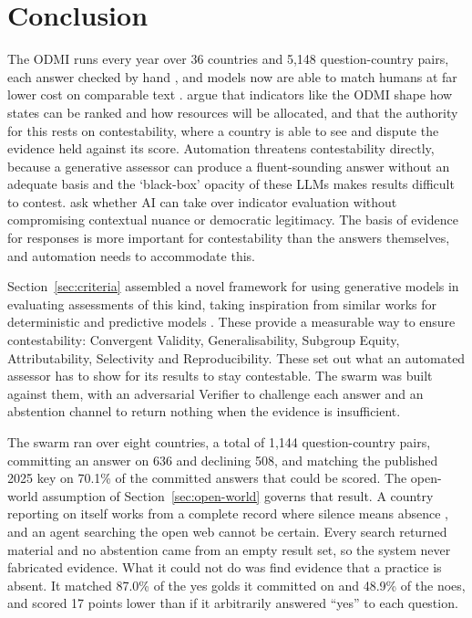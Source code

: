 \chapter{Conclusion}\label{ch:conclusion}

The ODMI runs every year over 36 countries and 5,148 question-country pairs, each answer checked by hand \citep{edp2025}, and models now are able to match humans at far lower cost on comparable text \citep{heseltine2024,tornberg2025}. \citet{davis2012} argue that indicators like the ODMI shape how states can be ranked and how resources will be allocated, and that the authority for this rests on contestability, where a country is able to see and dispute the evidence held against its score. Automation threatens contestability directly, because a generative assessor can produce a fluent-sounding answer without an adequate basis and the `black-box' opacity of these LLMs makes results difficult to contest. \citet{fumega2026} ask whether AI can take over indicator evaluation without compromising contextual nuance or democratic legitimacy. The basis of evidence for responses is more important for contestability than the answers themselves, and automation needs to accommodate this.

Section~\ref{sec:criteria} assembled a novel framework for using generative models in evaluating assessments of this kind, taking inspiration from similar works for deterministic and predictive models \citep{yung2022,williamson2012,schenk2024}. These provide a measurable way to ensure contestability: Convergent Validity, Generalisability, Subgroup Equity, Attributability, Selectivity and Reproducibility. These set out what an automated assessor has to show for its results to stay contestable. The swarm was built against them, with an adversarial Verifier to challenge each answer and an abstention channel to return nothing when the evidence is insufficient.

The swarm ran over eight countries, a total of 1,144 question-country pairs, committing an answer on 636 and declining 508, and matching the published 2025 key on 70.1\% of the committed answers that could be scored. The open-world assumption of Section~\ref{sec:open-world} governs that result. A country reporting on itself works from a complete record where silence means absence \citep{reiter1978}, and an agent searching the open web cannot be certain. Every search returned material and no abstention came from an empty result set, so the system never fabricated evidence. What it could not do was find evidence that a practice is absent. It matched 87.0\% of the yes golds it committed on and 48.9\% of the noes, and scored 17 points lower than if it arbitrarily answered ``yes'' to each question.

